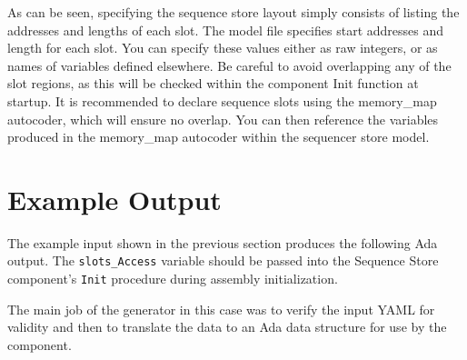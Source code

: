 
As can be seen, specifying the sequence store layout simply consists of listing the addresses and lengths of each slot. The model file specifies start addresses and length for each slot. You can specify these values either as raw integers, or as names of variables defined elsewhere. Be careful to avoid overlapping any of the slot regions, as this will be checked within the component Init function at startup. It is recommended to declare sequence slots using the memory\_map autocoder, which will ensure no overlap. You can then reference the variables produced in the memory\_map autocoder within the sequencer store model. 

\section{Example Output}

The example input shown in the previous section produces the following Ada output. The \texttt{slots\_Access} variable should be passed into the Sequence Store component's \texttt{Init} procedure during assembly initialization.

The main job of the generator in this case was to verify the input YAML for validity and then to translate the data to an Ada data structure for use by the component.



